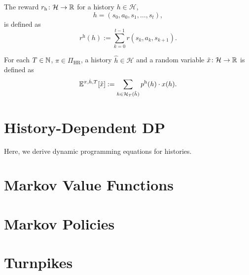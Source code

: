 \begin{definition}
  The reward $r_{\mathrm{h}}\colon \mathcal{H} \to \mathbb{R}$ for a history $h \in  \mathcal{H}$,
  \[
   h = (s_0, a_0, s_1, \dots , s_t), 
  \]
  is defined as
  \[
   r^{\mathrm{h}}(h) := \sum_{k=0}^{t-1} r(s_k, a_k, s_{k+1}).
 \]
 \leanok
\end{definition}

\begin{definition}
  For each $T\in \mathbb{N}$, $\pi\in \Pi_{\mathrm{HR}}$, a history $\hat{h}\in \mathcal{H}$ and a random variable $\tilde{x}\colon \mathcal{H} \to \mathbb{R}$ is defined as
  \[
   \mathbb{E}^{\pi, \hat{h}, T} [\tilde{x}]  := \sum_{h\in \mathcal{H}_T(\hat{h})} p^{\mathrm{h}}(h) \cdot x(h).
  \]
\end{definition}

\section{History-Dependent DP}

Here, we derive dynamic programming equations for histories.

\section{Markov Value Functions}


\section{Markov Policies}

\section{Turnpikes}

